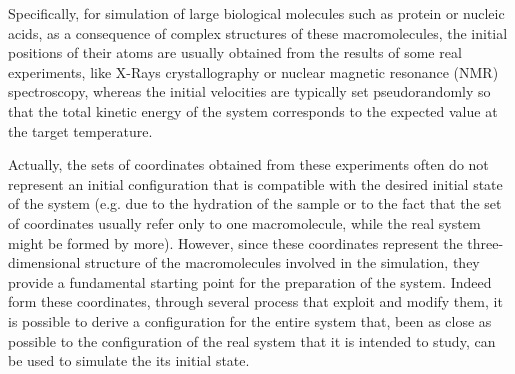 Specifically, for simulation of large biological molecules such as protein or nucleic acids, as a consequence of complex structures of these macromolecules, the initial positions of their atoms  are usually obtained from the results of some real experiments, like X-Rays crystallography or nuclear magnetic resonance (NMR) spectroscopy, whereas the initial velocities are typically set pseudorandomly so that the total kinetic energy of the system corresponds to the expected value at the target temperature.


Actually, the sets of coordinates obtained from these experiments often do not represent an initial configuration that is compatible with the desired initial state of the system (e.g. due to the hydration of the sample or to the fact that the set of coordinates usually refer only to one macromolecule, while the real system might be formed by more).
However, since these coordinates represent the three-dimensional structure of the macromolecules involved in the simulation, they provide a fundamental starting point for the preparation of the system. 
Indeed form these coordinates, through several process that exploit and modify them, it is possible to derive a configuration for the entire system that, been as close as possible to the configuration of the real system that it is intended to study, can be used to simulate the its initial state.

